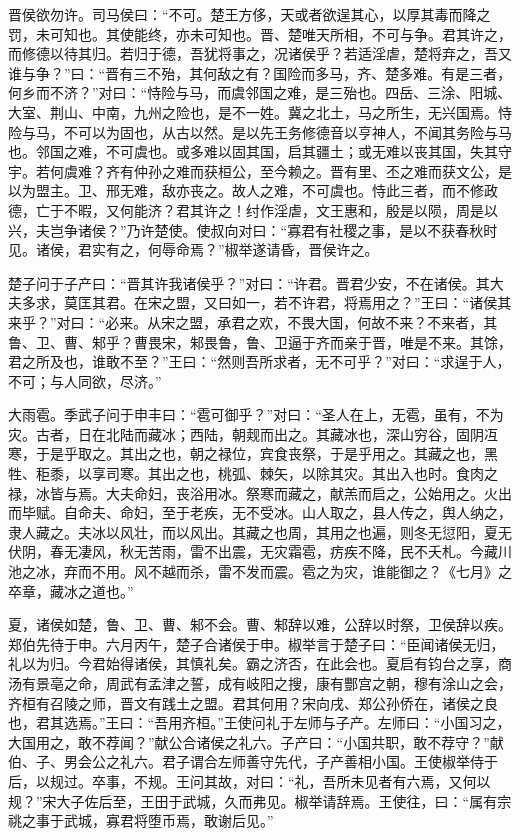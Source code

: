 \documentclass[]{article}
\begin{document}
晋侯欲勿许。司马侯曰：``不可。楚王方侈，天或者欲逞其心，以厚其毒而降之罚，未可知也。其使能终，亦未可知也。晋、楚唯天所相，不可与争。君其许之，而修德以待其归。若归于德，吾犹将事之，况诸侯乎？若适淫虐，楚将弃之，吾又谁与争？''曰：``晋有三不殆，其何敌之有？国险而多马，齐、楚多难。有是三者，何乡而不济？''对曰：``恃险与马，而虞邻国之难，是三殆也。四岳、三涂、阳城、大室、荆山、中南，九州之险也，是不一姓。冀之北土，马之所生，无兴国焉。恃险与马，不可以为固也，从古以然。是以先王务修德音以亨神人，不闻其务险与马也。邻国之难，不可虞也。或多难以固其国，启其疆土；或无难以丧其国，失其守宇。若何虞难？齐有仲孙之难而获桓公，至今赖之。晋有里、丕之难而获文公，是以为盟主。卫、邢无难，敌亦丧之。故人之难，不可虞也。恃此三者，而不修政德，亡于不暇，又何能济？君其许之！纣作淫虐，文王惠和，殷是以陨，周是以兴，夫岂争诸侯？''乃许楚使。使叔向对曰：``寡君有社稷之事，是以不获春秋时见。诸侯，君实有之，何辱命焉？''椒举遂请昏，晋侯许之。

楚子问于子产曰：``晋其许我诸侯乎？''对曰：``许君。晋君少安，不在诸侯。其大夫多求，莫匡其君。在宋之盟，又曰如一，若不许君，将焉用之？''王曰：``诸侯其来乎？''对曰：``必来。从宋之盟，承君之欢，不畏大国，何故不来？不来者，其鲁、卫、曹、邾乎？曹畏宋，邾畏鲁，鲁、卫逼于齐而亲于晋，唯是不来。其馀，君之所及也，谁敢不至？''王曰：``然则吾所求者，无不可乎？''对曰：``求逞于人，不可；与人同欲，尽济。''

大雨雹。季武子问于申丰曰：``雹可御乎？''对曰：``圣人在上，无雹，虽有，不为灾。古者，日在北陆而藏冰；西陆，朝觌而出之。其藏冰也，深山穷谷，固阴冱寒，于是乎取之。其出之也，朝之禄位，宾食丧祭，于是乎用之。其藏之也，黑牲、秬黍，以享司寒。其出之也，桃弧、棘矢，以除其灾。其出入也时。食肉之禄，冰皆与焉。大夫命妇，丧浴用冰。祭寒而藏之，献羔而启之，公始用之。火出而毕赋。自命夫、命妇，至于老疾，无不受冰。山人取之，县人传之，舆人纳之，隶人藏之。夫冰以风壮，而以风出。其藏之也周，其用之也遍，则冬无愆阳，夏无伏阴，春无凄风，秋无苦雨，雷不出震，无灾霜雹，疠疾不降，民不夭札。今藏川池之冰，弃而不用。风不越而杀，雷不发而震。雹之为灾，谁能御之？《七月》之卒章，藏冰之道也。''

夏，诸侯如楚，鲁、卫、曹、邾不会。曹、邾辞以难，公辞以时祭，卫侯辞以疾。郑伯先待于申。六月丙午，楚子合诸侯于申。椒举言于楚子曰：``臣闻诸侯无归，礼以为归。今君始得诸侯，其慎礼矣。霸之济否，在此会也。夏启有钧台之享，商汤有景亳之命，周武有孟津之誓，成有岐阳之搜，康有酆宫之朝，穆有涂山之会，齐桓有召陵之师，晋文有践土之盟。君其何用？宋向戌、郑公孙侨在，诸侯之良也，君其选焉。''王曰：``吾用齐桓。''王使问礼于左师与子产。左师曰：``小国习之，大国用之，敢不荐闻？''献公合诸侯之礼六。子产曰：``小国共职，敢不荐守？''献伯、子、男会公之礼六。君子谓合左师善守先代，子产善相小国。王使椒举侍于后，以规过。卒事，不规。王问其故，对曰：``礼，吾所未见者有六焉，又何以规？''宋大子佐后至，王田于武城，久而弗见。椒举请辞焉。王使往，曰：``属有宗祧之事于武城，寡君将堕币焉，敢谢后见。''
\end{document}
